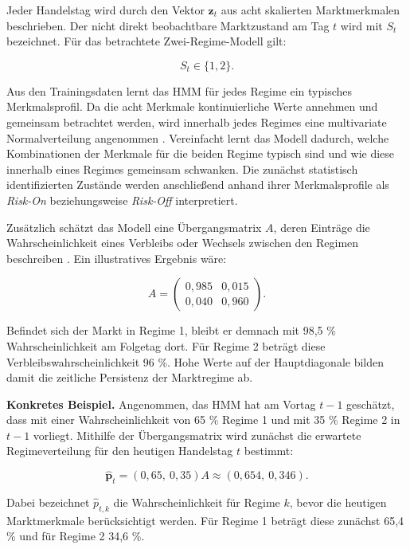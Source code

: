 \vspace{0.5cm}

Jeder Handelstag wird durch den Vektor $\mathbf{z}_t$ aus acht skalierten Marktmerkmalen beschrieben. Der nicht direkt beobachtbare Marktzustand am Tag $t$ wird mit $S_t$ bezeichnet. Für das betrachtete Zwei-Regime-Modell gilt:

$$
S_t \in \{1,2\}.
$$

Aus den Trainingsdaten lernt das HMM für jedes Regime ein typisches Merkmalsprofil. Da die acht Merkmale kontinuierliche Werte annehmen und gemeinsam betrachtet werden, wird innerhalb jedes Regimes eine multivariate Normalverteilung angenommen \cite{stadler_penalized_2013}. Vereinfacht lernt das Modell dadurch, welche Kombinationen der Merkmale für die beiden Regime typisch sind und wie diese innerhalb eines Regimes gemeinsam schwanken. Die zunächst statistisch identifizierten Zustände werden anschließend anhand ihrer Merkmalsprofile als \textit{Risk-On} beziehungsweise \textit{Risk-Off} interpretiert.

\vspace{0.5cm}

Zusätzlich schätzt das Modell eine Übergangsmatrix $A$, deren Einträge die Wahrscheinlichkeit eines Verbleibs oder Wechsels zwischen den Regimen beschreiben \cite{rabiner_tutorial_1989, elliott_application_1997}. Ein illustratives Ergebnis wäre:

$$
A=
\begin{pmatrix}
0{,}985 & 0{,}015 \\
0{,}040 & 0{,}960
\end{pmatrix}.
$$

Befindet sich der Markt in Regime 1, bleibt er demnach mit 98,5 \% Wahrscheinlichkeit am Folgetag dort. Für Regime 2 beträgt diese Verbleibswahrscheinlichkeit 96 \%. Hohe Werte auf der Hauptdiagonale bilden damit die zeitliche Persistenz der Marktregime ab.

\vspace{0.5cm}

\textbf{Konkretes Beispiel.} Angenommen, das HMM hat am Vortag $t-1$ geschätzt, dass mit einer Wahrscheinlichkeit von 65 \% Regime 1 und mit 35 \% Regime 2 in $t-1$ vorliegt. Mithilfe der Übergangsmatrix wird zunächst die erwartete Regimeverteilung für den heutigen Handelstag $t$ bestimmt:

$$
\hat{\mathbf{p}}_t
=
(0{,}65,\ 0{,}35)A
\approx
(0{,}654,\ 0{,}346).
$$

Dabei bezeichnet $\hat{p}_{t,k}$ die Wahrscheinlichkeit für Regime $k$, bevor die heutigen Marktmerkmale berücksichtigt werden. Für Regime 1 beträgt diese zunächst 65,4 \% und für Regime 2 34,6 \%.

